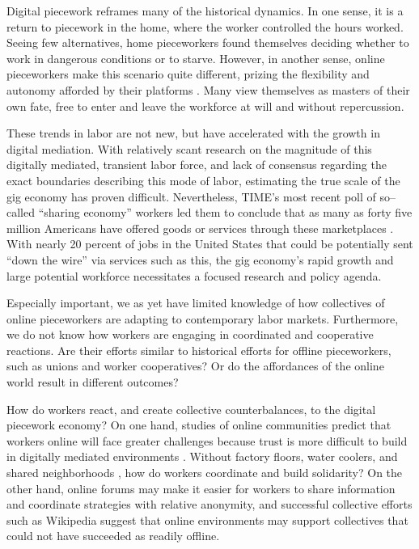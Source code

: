 \documentclass[11pt]{article}
\begin{document}
Digital piecework reframes many of the historical dynamics.
In one sense, it is a return to piecework in the home,
where the worker controlled the hours worked.
Seeing few alternatives,
home pieceworkers found themselves deciding whether to work in dangerous conditions or to starve.
However, in another sense,
online pieceworkers make this scenario quite different,
prizing the flexibility and autonomy afforded by their platforms
\citep{martin2014being}.
Many view themselves as masters of their own fate, free to enter and leave the workforce at will and without repercussion.

These trends in labor are not new,
but have accelerated with the growth in digital mediation.
With relatively scant research on the magnitude of this digitally mediated,
transient labor force,
and lack of consensus regarding the exact boundaries describing this mode of labor,
estimating the true scale of the gig economy has proven difficult.
Nevertheless,
TIME's most recent poll of so--called
``sharing economy'' workers led them to conclude that
as many as forty five million Americans have offered goods or services through these marketplaces
\citep{sharingEconomyPoll}.
With nearly 20 percent of jobs in the United States that could be potentially sent
``down the wire''
\citep{blinder2006offshoring}
via services such as this,
the gig economy's rapid growth and large potential workforce necessitates a focused research and policy agenda.

Especially important,
we as yet have limited knowledge of how
collectives of online pieceworkers are adapting to contemporary labor markets.
Furthermore, we do not know how workers are engaging in coordinated and cooperative reactions.
Are their efforts similar to historical efforts for offline pieceworkers,
such as unions and worker cooperatives?
Or do the affordances of the online world result in different outcomes?

How do workers react, and create collective counterbalances,
to the digital piecework economy?
On one hand, studies of online communities predict that
workers online will face greater challenges because
trust is more difficult to build in digitally mediated environments
\citep{successfulOnlineCommunities,kollock2005managing,cook2005cooperation}.
Without
  factory floors,
  water coolers, and
  shared neighborhoods
\citep{waterCooler},
how do workers coordinate and build solidarity?
On the other hand,
online forums may make it easier for workers to
  share information and
  coordinate strategies with relative anonymity,
and successful collective efforts
such as Wikipedia
suggest that online environments may support collectives
that could not have succeeded as readily offline.
\end{document}
